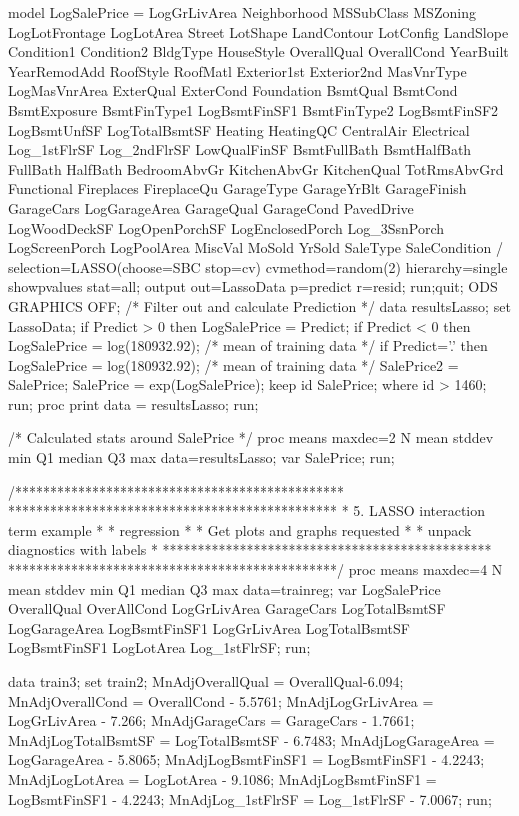 model LogSalePrice = LogGrLivArea Neighborhood MSSubClass MSZoning LogLotFrontage LogLotArea 
Street LotShape LandContour LotConfig LandSlope Condition1 Condition2 BldgType HouseStyle 
OverallQual OverallCond YearBuilt YearRemodAdd RoofStyle RoofMatl Exterior1st Exterior2nd 
MasVnrType LogMasVnrArea ExterQual ExterCond Foundation BsmtQual BsmtCond BsmtExposure 
BsmtFinType1 LogBsmtFinSF1 BsmtFinType2 LogBsmtFinSF2 LogBsmtUnfSF LogTotalBsmtSF Heating 
HeatingQC CentralAir Electrical Log_1stFlrSF Log_2ndFlrSF LowQualFinSF BsmtFullBath BsmtHalfBath 
FullBath HalfBath BedroomAbvGr KitchenAbvGr KitchenQual TotRmsAbvGrd 
Functional Fireplaces FireplaceQu GarageType GarageYrBlt GarageFinish GarageCars LogGarageArea 
GarageQual GarageCond PavedDrive LogWoodDeckSF LogOpenPorchSF LogEnclosedPorch Log_3SsnPorch 
LogScreenPorch LogPoolArea MiscVal MoSold YrSold SaleType SaleCondition 
/ selection=LASSO(choose=SBC stop=cv) cvmethod=random(2) hierarchy=single showpvalues stat=all;
output out=LassoData p=predict r=resid;
run;quit;
ODS GRAPHICS OFF; 
/* Filter out and calculate Prediction */
data resultsLasso;
	set LassoData;
	if Predict > 0 then LogSalePrice = Predict;
	if Predict < 0 then LogSalePrice = log(180932.92); /* mean of training data */
	if Predict='.' then LogSalePrice = log(180932.92); /* mean of training data */
	SalePrice2 = SalePrice;
	SalePrice = exp(LogSalePrice);
	keep id SalePrice;
	where id > 1460;
run;
proc print data = resultsLasso;
run;

/* Calculated stats around SalePrice */
proc means maxdec=2 N mean stddev min Q1 median Q3 max data=resultsLasso;
var SalePrice;
run;

/***********************************************
 ***********************************************
 *        5. LASSO interaction term example    *
 *        regression                           *
 *        Get plots and graphs requested       *
 *        unpack diagnostics with labels       *
 ***********************************************
 ***********************************************/
proc means maxdec=4 N mean stddev min Q1 median Q3 max data=trainreg;
var LogSalePrice OverallQual OverAllCond LogGrLivArea GarageCars LogTotalBsmtSF LogGarageArea LogBsmtFinSF1
    LogGrLivArea LogTotalBsmtSF LogBsmtFinSF1 LogLotArea Log_1stFlrSF;
run;

data train3; set train2;
MnAdjOverallQual = OverallQual-6.094;
MnAdjOverallCond = OverallCond - 5.5761;
MnAdjLogGrLivArea = LogGrLivArea - 7.266;
MnAdjGarageCars = GarageCars - 1.7661;
MnAdjLogTotalBsmtSF = LogTotalBsmtSF - 6.7483;
MnAdjLogGarageArea = LogGarageArea - 5.8065;
MnAdjLogBsmtFinSF1 = LogBsmtFinSF1 - 4.2243;
MnAdjLogLotArea = LogLotArea - 9.1086;
MnAdjLogBsmtFinSF1 = LogBsmtFinSF1 - 4.2243;
MnAdjLog_1stFlrSF = Log_1stFlrSF - 7.0067;
run;

